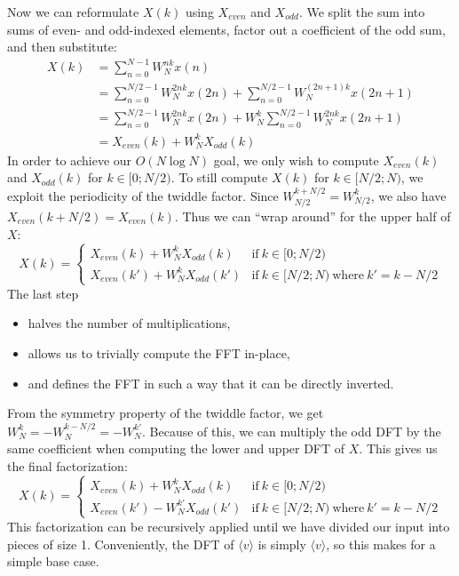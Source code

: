 Now we can reformulate $X(k)$ using $X_\textit{even}$ and $X_\textit{odd}$.
We split the sum into sums of even- and odd-indexed elements,
factor out a coefficient of the odd sum,
and then substitute:
\begin{align}
    X(k) &= \sum_{n = 0}^{N - 1} W_N^{nk} x(n) \\
    &= \sum_{n = 0}^{N/2 - 1} W_N^{2nk} x(2n) + \sum_{n = 0}^{N/2 - 1} W_N^{(2n + 1)k} x(2n + 1) \\
    &= \sum_{n = 0}^{N/2 - 1} W_N^{2nk} x(2n) + W_N^k \sum_{n = 0}^{N/2 - 1} W_N^{2nk} x(2n + 1) \\
    &= X_\textit{even}(k) + W_N^k X_\textit{odd}(k)
\end{align}
%
In order to achieve our $O(N \log N)$ goal,
we only wish to compute $X_\textit{even}(k)$ and $X_\textit{odd}(k)$ for $k \in [0;N/2)$.
To still compute $X(k)$ for $k \in [N/2;N)$, we exploit the periodicity of the twiddle factor.
Since $W_{N/2}^{k + N/2} = W_{N/2}^k$, we also have $X_\textit{even}(k + N/2) = X_\textit{even}(k)$.
Thus we can ``wrap around'' for the upper half of $X$:
\begin{equation}
    X(k) =
    \begin{cases}
        X_\textit{even}(k) + W_N^k X_\textit{odd}(k) &\text{if}~k \in [0;N/2) \\
        X_\textit{even}(k') + W_N^{k} X_\textit{odd}(k') &\text{if}~k \in [N/2;N) ~\text{where}~k' = k - N/2
    \end{cases}
\end{equation}
%
The last step
\begin{itemize}
    \item halves the number of multiplications,
    \item allows us to trivially compute the FFT in-place,
    \item and defines the FFT in such a way that it can be directly inverted.
\end{itemize}

From the symmetry property of the twiddle factor, we get $W_N^k = -W_N^{k - N/2} = -W_N^{k'}$.
Because of this,
we can multiply the odd DFT by the same coefficient when computing the lower and upper DFT of $X$.
This gives us the final factorization:
\begin{equation}
    X(k) =
    \begin{cases}
        X_\textit{even}(k) + W_N^k X_\textit{odd}(k) &\text{if}~k \in [0;N/2) \\
        X_\textit{even}(k') - W_N^{k'} X_\textit{odd}(k') &\text{if}~k \in [N/2;N) ~\text{where}~k' = k - N/2
    \end{cases}
\end{equation}
This factorization can be recursively applied
until we have divided our input into pieces of size 1.
Conveniently, the DFT of $\langle v \rangle$ is simply $\langle v \rangle$,
so this makes for a simple base case.

